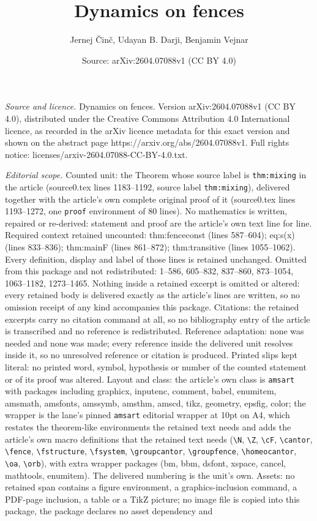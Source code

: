 \documentclass[10pt,a4paper]{amsart}
\title[Dynamics on fences]{Dynamics on fences}
\author{Jernej \v{C}in\v{c}, Udayan B. Darji, Benjamin Vejnar}
\date{Source: arXiv:2604.07088v1 (CC BY 4.0)}
\begin{document}
\maketitle

\noindent\emph{Source and licence.} Dynamics on fences. Version arXiv:2604.07088v1 (CC BY 4.0), distributed under the Creative Commons Attribution 4.0 International licence, as recorded in the arXiv licence metadata for this exact version and shown on the abstract page https://arxiv.org/abs/2604.07088v1. Full rights notice: licenses/arxiv-2604.07088-CC-BY-4.0.txt.\par\smallskip

\noindent\textit{Editorial scope.} Counted unit: the Theorem whose source label is \texttt{thm:mixing} in the article (source0.tex lines 1183--1192, source label \texttt{thm:mixing}), delivered together with the article's own complete original proof of it (source0.tex lines 1193--1272, one \texttt{proof} environment of 80 lines). No mathematics is written, repaired or re-derived: statement and proof are the article's own text line for line. Required context retained uncounted: thm:fenceconst (lines 587--604); eq:s(x) (lines 833--836); thm:mainF (lines 861--872); thm:transitive (lines 1055--1062). Every definition, display and label of those lines is retained unchanged. Omitted from this package and not redistributed: 1--586, 605--832, 837--860, 873--1054, 1063--1182, 1273--1465. Nothing inside a retained excerpt is omitted or altered: every retained body is delivered exactly as the article's lines are written, so no omission receipt of any kind accompanies this package. Citations: the retained excerpts carry no citation command at all, so no bibliography entry of the article is transcribed and no reference is redistributed. Reference adaptation: none was needed and none was made; every reference inside the delivered unit resolves inside it, so no unresolved reference or citation is produced. Printed slips kept literal: no printed word, symbol, hypothesis or number of the counted statement or of its proof was altered. Layout and class: the article's own class is \texttt{amsart} with packages including graphicx, inputenc, comment, babel, enumitem, amsmath, amsfonts, amssymb, amsthm, amscd, tikz, geometry, epsfig, color; the wrapper is the lane's pinned \texttt{amsart} editorial wrapper at 10pt on A4, which restates the theorem-like environments the retained text needs and adds the article's own macro definitions that the retained text needs (\texttt{\textbackslash N}, \texttt{\textbackslash Z}, \texttt{\textbackslash cF}, \texttt{\textbackslash cantor}, \texttt{\textbackslash fence}, \texttt{\textbackslash fstructure}, \texttt{\textbackslash fsystem}, \texttt{\textbackslash groupcantor}, \texttt{\textbackslash groupfence}, \texttt{\textbackslash homeocantor}, \texttt{\textbackslash oa}, \texttt{\textbackslash orb}), with extra wrapper packages (bm, bbm, dsfont, xspace, cancel, mathtools, enumitem). The delivered numbering is the unit's own. Assets: no retained span contains a figure environment, a graphics-inclusion command, a PDF-page inclusion, a table or a TikZ picture; no image file is copied into this package, the package declares no asset dependency and 
\end{document}
